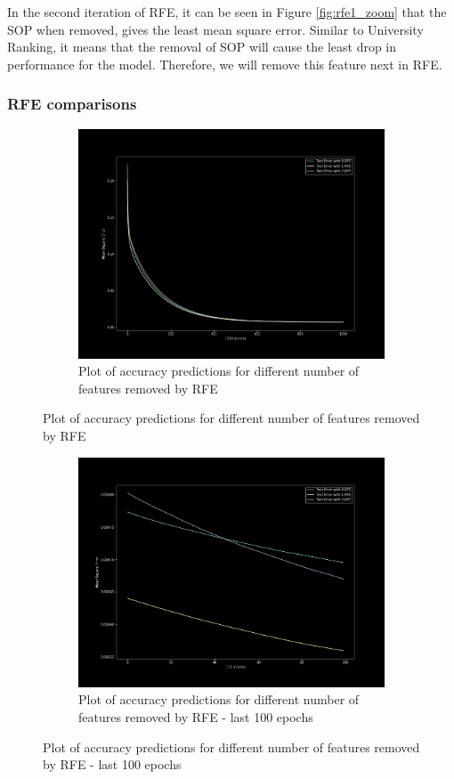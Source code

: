 In the second iteration of RFE, it can be seen in Figure \ref{fig:rfe1_zoom} that the SOP when removed, gives the least mean square error. Similar to University Ranking, it means that the removal of SOP will cause the least drop in performance for the model. Therefore, we will remove this feature next in RFE.

\subsubsection{RFE comparisons}
\begin{figure}[H]
    \begin{subfigure}{1\textwidth}
        \centering
        \includegraphics[width=0.8\linewidth]{assets/plots2/part3_7.png}
        \caption{Plot of accuracy predictions for different number of features removed by RFE}
        \label{fig:rfe3}
    \end{subfigure}
\end{figure}
\begin{figure}[H]
    \ContinuedFloat
    \begin{subfigure}{1\textwidth}
        \centering
        \includegraphics[width=0.8\linewidth]{assets/plots2/part3_8.png}
        \caption{Plot of accuracy predictions for different number of features removed by RFE - last 100 epochs}
        \label{fig:rfe3_zoom}
    \end{subfigure}
\end{figure}

